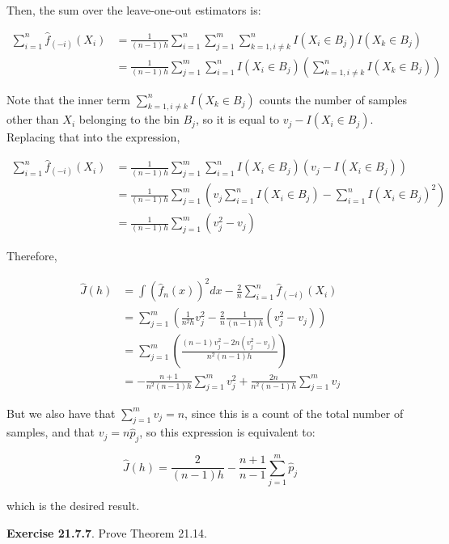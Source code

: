 Then, the sum over the leave-one-out estimators is:

\begin{align*}
\sum_{i=1}^{n} \hat{f}_{(-i)}(X_{i}) &= \frac{1}{(n - 1)h} \sum_{i=1}^{n} \sum_{j=1}^m \sum_{k=1, i \neq k}^{n} I(X_{i} \in B_{j}) I(X_{k} \in B_{j}) \\
&= \frac{1}{(n - 1)h} \sum_{j=1}^m \sum_{i=1}^{n} I(X_{i} \in B_{j})\left( \sum_{k=1, i \neq k}^{n} I(X_{k} \in B_{j}) \right)
\end{align*}

Note that the inner term \(\sum_{k=1, i \neq k}^{n} I(X_{k} \in B_{j})\)
counts the number of samples other than \(X_{i}\) belonging to the bin
\(B_{j}\), so it is equal to \(v_{j} - I(X_{i} \in B_{j})\). Replacing that into
the expression,

\begin{align*}
\sum_{i=1}^{n} \hat{f}_{(-i)}(X_{i}) &= \frac{1}{(n - 1)h} \sum_{j=1}^m \sum_{i=1}^{n} I(X_{i} \in B_{j}) (v_{j} - I(X_{i} \in B_{j})) \\
&= \frac{1}{(n - 1)h} \sum_{j=1}^m \left( v_{j} \sum_{i=1}^{n} I(X_{i} \in B_{j}) - \sum_{i=1}^{n} I(X_{i} \in B_{j})^{2} \right) \\
&= \frac{1}{(n - 1)h} \sum_{j=1}^m \left( v_{j}^{2} - v_{j} \right)
\end{align*}

Therefore,

\begin{align*}
\hat{J}(h) &= \int \left( \hat{f}_{n}(x) \right)^{2} dx - \frac{2}{n} \sum_{i=1}^{n} \hat{f}_{(-i)}(X_{i}) \\
&= \sum_{j=1}^m \left( \frac{1}{n^{2}h} v_{j}^{2} - \frac{2}{n} \frac{1}{(n - 1)h} \left( v_{j}^{2} - v_{j} \right) \right)\\
&= \sum_{j=1}^m \left( \frac{(n - 1) v_{j}^{2} - 2n(v_{j}^{2} - v_{j})}{n^{2}(n - 1)h} \right) \\
&= - \frac{n+1}{n^{2}(n - 1)h} \sum_{j=1}^m v_{j}^{2} + \frac{2n}{n^{2}(n - 1)h} \sum_{j=1}^m v_{j}
\end{align*}

But we also have that \(\sum_{j=1}^m v_{j} = n\), since this is a count of
the total number of samples, and that \(v_{j} = n \hat{p}_{j}\), so this
expression is equivalent to:

\[ \hat{J}(h) = \frac{2}{(n - 1)h} - \frac{n + 1}{n - 1} \sum_{j=1}^m \hat{p}_{j}\]

which is the desired result.

\textbf{Exercise 21.7.7}. Prove Theorem 21.14.

